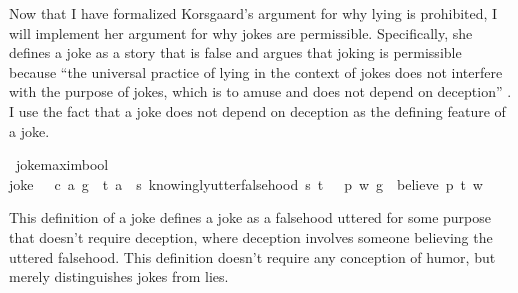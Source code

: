\begin{isabellebody}
\begin{isamarkuptext}
Now that I have formalized Korsgaard's argument for why lying is prohibited, I will
implement her argument for why jokes are permissible. Specifically, she defines a joke as a story that is 
false and argues that joking is permissible because ``the universal practice of lying in the context of jokes
does not interfere with the purpose of jokes, which is to amuse and does not depend on
deception'' \citep[4]{KorsgaardRTL}. I use the fact that a joke does not depend on deception as the 
defining feature of a joke.%
\end{isamarkuptext}\isamarkuptrue%
\isamarkupfalse%
\ joke{\isacharcolon}{\isacharcolon}{\isachardoublequoteopen}maxim{\isasymRightarrow}bool{\isachardoublequoteclose}\ \ \isanewline
{\isachardoublequoteopen}joke\ {\isasymequiv}\ {\isasymlambda}\ {\isacharparenleft}c{\isacharcomma}\ a{\isacharcomma}\ g{\isacharparenright}{\isachardot}\ \ {\isasymexists}t{\isachardot}\ {\isacharparenleft}a\ \isactrlbold {\isasymlongrightarrow}\ {\isacharparenleft}{\isasymlambda}s{\isachardot}\ knowingly{\isacharunderscore}utter{\isacharunderscore}falsehood\ s\ t{\isacharparenright}{\isacharparenright}\ {\isasymand}\ {\isasymnot}\ {\isacharparenleft}{\isasymexists}p{\isachardot}\ {\isasymforall}w{\isachardot}\ {\isacharparenleft}g\ \isactrlbold {\isasymrightarrow}\ {\isacharparenleft}believe\ p\ t{\isacharparenright}{\isacharparenright}\ w{\isacharparenright}{\isachardoublequoteclose}\isanewline
%
%
\begin{isamarkuptext}%
This definition of a joke defines a joke as a falsehood uttered for some purpose that 
doesn't require deception, where deception involves someone believing the uttered falsehood. 
This definition doesn't require any conception of humor, but merely
distinguishes jokes from lies. 


\end{isamarkuptext}
\end{isabellebody}
